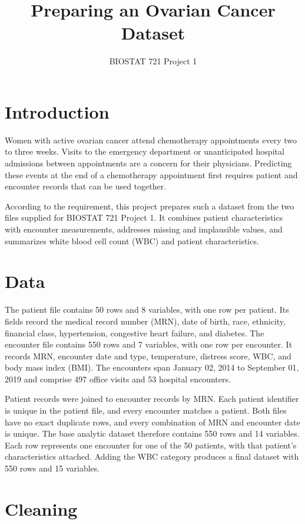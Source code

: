 \documentclass[11pt,letterpaper]{article}
\title{Preparing an Ovarian Cancer Dataset}
\author{BIOSTAT 721 Project 1}
\date{}
\begin{document}
\maketitle
\vspace{-1.5em}
\section{Introduction}\label{introduction}

Women with active ovarian cancer attend chemotherapy appointments every
two to three weeks. Visits to the emergency department or unanticipated
hospital admissions between appointments are a concern for their
physicians. Predicting these events at the end of a chemotherapy
appointment first requires patient and encounter records that can be
used together.

According to the requirement, this project prepares such a dataset from
the two files supplied for BIOSTAT 721 Project 1. It combines patient
characteristics with encounter measurements, addresses missing and
implausible values, and summarizes white blood cell count (WBC) and
patient characteristics.

\section{Data}\label{data}

The patient file contains 50 rows and 8 variables, with one row per
patient. Its fields record the medical record number (MRN), date of
birth, race, ethnicity, financial class, hypertension, congestive heart
failure, and diabetes. The encounter file contains 550 rows and 7
variables, with one row per encounter. It records MRN, encounter date
and type, temperature, distress score, WBC, and body mass index (BMI).
The encounters span January 02, 2014 to September 01, 2019 and comprise
497 office visits and 53 hospital encounters.

Patient records were joined to encounter records by MRN. Each patient
identifier is unique in the patient file, and every encounter matches a
patient. Both files have no exact duplicate rows, and every combination
of MRN and encounter date is unique. The base analytic dataset therefore
contains 550 rows and 14 variables. Each row represents one encounter
for one of the 50 patients, with that patient's characteristics
attached. Adding the WBC category produces a final dataset with 550 rows
and 15 variables.

\section{Cleaning}\label{cleaning}
\end{document}
